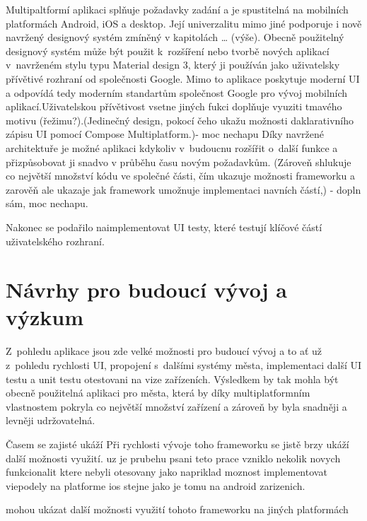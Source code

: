 \bigskip

Multipaltformí aplikaci splňuje požadavky zadání a je spustitelná na mobilních platformách Android, iOS a desktop. Její univerzalitu 
mimo jiné podporuje i nově navržený designový systém zmíněný v kapitolách … (výše). Obecně použitelný designový systém může být použit
 k~rozšíření nebo tvorbě nových aplikací v~navrženém stylu typu Material design 3, který ji používán jako uživatelsky přívětivé rozhraní 
 od společnosti Google. Mimo to aplikace poskytuje moderní UI a odpovídá tedy moderním standartům společnost Google pro vývoj mobilních 
 aplikací.Uživatelskou přívětivost vsetne jiných fukci doplňuje vyuziti tmavého motivu (řežimu?).(Jedinečný design, pokocí čeho ukažu 
 možnosti daklarativního zápisu UI pomocí Compose Multiplatform.)- moc nechapu
Díky navržené architektuře je možné aplikaci kdykoliv v~budoucnu rozšířit o~další funkce a přizpůsobovat ji snadvo v průběhu času novým 
požadavkům. (Zároveň shlukuje co největší množství kódu ve společné části, čím ukazuje možnosti frameworku a zarověň ale ukazaje jak 
framework umožnuje implementaci navních částí,) - dopln sám, moc nechapu.

Nakonec se podařilo naimplementovat UI testy, které testují klíčové částí uživatelského rozhraní. 



\section{Návrhy pro budoucí vývoj a výzkum}
Z~pohledu aplikace jsou zde velké možnosti pro budoucí vývoj a to ať už z~pohledu rychlosti UI, propojení s~dalšími systémy města, 
implementaci další UI testu a unit testu otestovani na vize zařízeních. Výsledkem by tak mohla být obecně použitelná aplikaci pro města,
která by díky multiplatformním vlastnostem pokryla co největší množství zařízení a zároveň by byla snadněji a levněji udržovatelná.

Časem se zajisté ukáží
Při rychlosti vývoje toho frameworku se jistě brzy ukáží další možnosti využití.
uz je prubehu psani teto prace vzniklo nekolik novych funkcionalit ktere nebyli otesovany jako napriklad moznost
implementovat viepodely na platforme ios stejne jako je tomu na android zarizenich.




mohou ukázat další možnosti využití tohoto frameworku na jiných platformách
